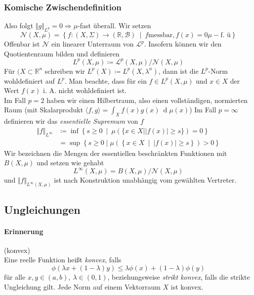 \documentclass[12pt,a4paper,fleqn]{article}
\def\set#1{{\left\{ #1 \right\}}}
\def\Mid{\ \middle|\ }
\def\d{{\operatorname{d}}}
\begin{document}
\subsubsection*{Komische Zwischendefinition} 
Also folgt $\Vert g \Vert_{L^p} = 0 \Rightarrow \mu$-fast überall. Wir setzen
\begin{displaymath}
\mathcal{N}(X, \mu) = \set{f\colon (X, \Sigma) \rightarrow (\mathbb{R}, \mathcal{B}) \Mid f \text{messbar}, f(x) = 0 \mu-\text{f. ü}}
\end{displaymath}
Offenbar ist $\mathcal{N}$ ein linearer Unterraum von $\mathscr{L}^p$. Insofern können wir den Quotientenraum bilden und definieren
\begin{displaymath}
L^p(X, \mu) \coloneqq \mathscr{L}^p(X, \mu)/\mathcal{N}(X, \mu)
\end{displaymath}
Für $(X \subset \mathbb{R}^n$ schreiben wir $L^p(X) \coloneqq L^p(X, \lambda^n)$, dann ist die $L^p$-Norm wohldefiniert auf $L^p$.
Man beachte, dass für ein $f \in L^p(X, \mu)$ und $ x\in X$ der Wert $f(x)$ i. A. nicht wohldefiniert ist.\\
Im Fall $p = 2$ haben wir einen Hilbertraum, also einen vollständigen, normierten Raum (mit Skalarprodukt $\langle f, g\rangle = \int_X f(x)g(x)\ \d\mu(x)$)
Im Fall $ p = \infty$ definieren wir das \textit{essentielle Supremum} von $f$
\begin{align*}
\Vert f \Vert_{L^\infty} &\coloneqq \inf \set{s \geq 0 \Mid \mu(\{x \in X \mid \vert f(x)\vert \geq s\})=0}\\
&= \sup \set{s\geq 0 \mid \mu(\set{x \in X \Mid \vert f(x) \vert \geq s }) > 0 } 
\end{align*}
Wir bezeichnen die Mengen der essentiellen beschränkten Funktionen mit $B(X, \mu)$ und setzen wie gehabt 
\begin{displaymath}
L^\infty(X, \mu) = B(X, \mu)/\mathcal{N}(X, \mu)
\end{displaymath}
und $\Vert f \Vert_{L^\infty (X, \mu)}$ ist nach Konstruktion unabhängig vom gewählten Vertreter.

\subsection{Ungleichungen}

\paragraph{Erinnerung} (konvex)\\
Eine reelle Funktion heißt \textit{konvex}, falls
\begin{displaymath}
\phi(\lambda x + (1 - \lambda) y ) \leq \lambda \phi (x) + (1 - \lambda) \phi(y)
\end{displaymath}
für alle $x, y \in (a, b),\ \lambda \in (0,1)$, beziehungsweise \textit{strikt konvex}, falls die strikte Ungleichung gilt. Jede Norm auf einem Vektorraum $X$ ist konvex.
\end{document}
